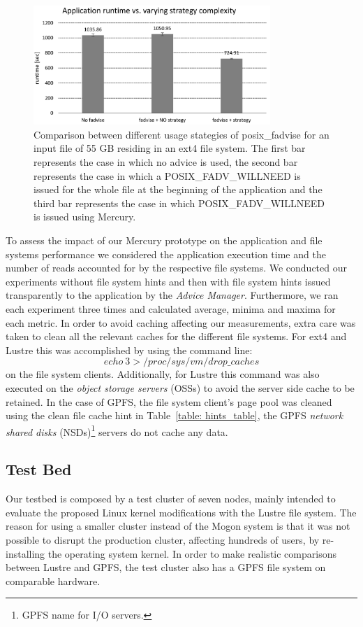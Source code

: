 \begin{figure}[!htb]
  \centering
  \includegraphics[width=0.8\textwidth]{figures/test_fadvise_no_border}
  \caption{Comparison between different usage stategies of posix\_fadvise for an input file of 55 GB residing in an ext4 file system. The first bar represents the case in which no advice is used, 
  the second bar represents the case in which a POSIX\_FADV\_WILLNEED is issued for the whole file at the beginning of the application and the third bar represents the case in which POSIX\_FADV\_WILLNEED 
  is issued using Mercury.}
  \label{figure: fadvise_comparison}
\end{figure} 

To assess the impact of our Mercury prototype on the application and file systems performance we considered the application execution time and the number of reads accounted for by the respective file systems. 
We conducted our experiments without file system hints and then with file system hints issued transparently to the application by the \textit{Advice Manager}. Furthermore, we ran each experiment three 
times and calculated average, minima and maxima for each metric. In order to avoid caching affecting our measurements, extra care was taken to clean all the relevant caches for the different file systems. 
For ext4 and Lustre this was accomplished by using the command line: $$echo\ 3 > /proc/sys/vm/drop\_caches$$ on the file system clients. Additionally, for Lustre this command was also executed on the
\textit{object storage servers} (OSSs) to avoid the server side cache to be retained. In the case of GPFS, the file system client's page pool was cleaned using the clean file cache hint in Table~\ref{table: hints_table}, 
the GPFS \textit{network shared disks} (NSDs)\footnote{GPFS name for I/O servers.} servers do not cache any data. 


\subsection{Test Bed}
Our testbed is composed by a test cluster of seven nodes, mainly intended to evaluate the proposed Linux kernel modifications with the Lustre file system. The reason 
for using a smaller cluster instead of the Mogon system is that it was not possible to disrupt the production cluster, affecting hundreds of users, by re-installing 
the operating system kernel. In order to make realistic comparisons between Lustre and GPFS, the test cluster also has a GPFS file system on comparable hardware. 


